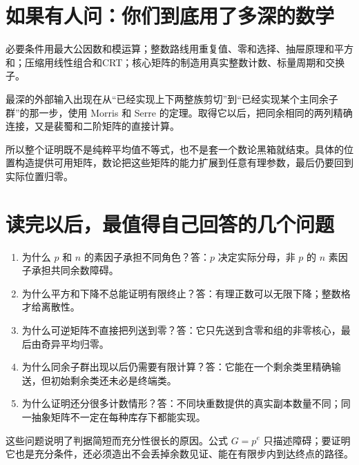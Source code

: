 \section{如果有人问：你们到底用了多深的数学}
必要条件用最大公因数和模运算；整数路线用重复值、零和选择、抽屉原理和平方和；压缩用线性组合和CRT；核心矩阵的制造用真实整数计数、标量周期和交换子。

最深的外部输入出现在从“已经实现上下两整族剪切”到“已经实现某个主同余子群”的那一步，使用 Morris 和 Serre 的定理。取得它以后，把同余相同的两列精确连接，又是裴蜀和二阶矩阵的直接计算。

所以整个证明既不是纯粹平均值不等式，也不是套一个数论黑箱就结束。具体的位置构造提供可用矩阵，数论把这些矩阵的能力扩展到任意有理参数，最后仍要回到实际位置归零。

\section{读完以后，最值得自己回答的几个问题}
\begin{enumerate}
\item 为什么 $p$ 和 $n$ 的素因子承担不同角色？答：$p$ 决定实际分母，非 $p$ 的 $n$ 素因子承担共同余数障碍。
\item 为什么平方和下降不总能证明有限终止？答：有理正数可以无限下降；整数格才给离散性。
\item 为什么可逆矩阵不直接把列送到零？答：它只先送到含零和组的非零核心，最后由奇异平均归零。
\item 为什么同余子群出现以后仍需要有限计算？答：它能在一个剩余类里精确输送，但初始剩余类还未必是终端类。
\item 为什么证明还分很多计数情形？答：不同块重数提供的真实副本数量不同；同一抽象矩阵不一定在每种库存下都能实现。
\end{enumerate}
这些问题说明了判据简短而充分性很长的原因。公式 $G=p^e$ 只描述障碍；要证明它也是充分条件，还必须造出不会丢掉余数见证、能在有限步内到达终点的路径。
